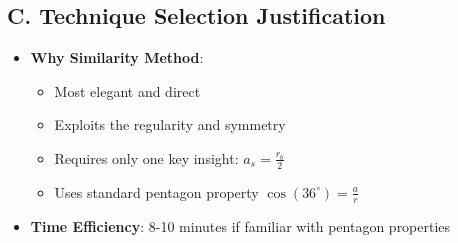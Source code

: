\documentclass[12pt]{article}
\begin{document}
\begin{techniquesbox}
\subsection*{C. Technique Selection Justification}
\begin{itemize}[leftmargin=*]
    \item \textbf{Why Similarity Method}: 
    \begin{itemize}
        \item Most elegant and direct
        \item Exploits the regularity and symmetry
        \item Requires only one key insight: $a_s = \frac{r_b}{2}$
        \item Uses standard pentagon property $\cos(36^\circ) = \frac{a}{r}$
    \end{itemize}
    \item \textbf{Time Efficiency}: 8-10 minutes if familiar with pentagon properties
\end{itemize}
\end{techniquesbox}
\end{document}
